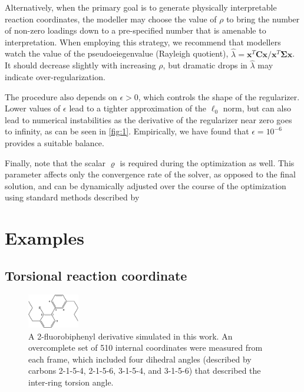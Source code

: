 \documentclass[aip, jcp, reprint, nolinenumbers, twocolumn, nobalancelastpage, nofootinbib]{revtex4-1}
\begin{document}
Alternatively, when the primary goal is to generate physically interpretable reaction coordinates, the modeller may choose the value of $\rho$ to bring the number of non-zero loadings down to a pre-specified number that is amenable to interpretation. When employing this strategy, we recommend that modellers watch the value of the pseudoeiegenvalue (Rayleigh quotient), $\hat{\lambda}=\mathbf{x}^T\mathbf{C}\mathbf{x} / \mathbf{x}^T \mathbf{\Sigma}\mathbf{x}$. It should decrease slightly with increasing $\rho$, but dramatic drops in $\hat{\lambda}$ may indicate over-regularization.

The procedure also depends on $\epsilon>0$, which controls the shape of the regularizer. Lower values of $\epsilon$ lead to a tighter approximation of the $\ell_0$ norm, but can also lead to numerical instabilities as the derivative of the regularizer near zero goes to infinity, as can be seen in \cref{fig:1}. Empirically, we have found that $\epsilon=10^{-6}$ provides a suitable balance.

Finally, note that the scalar $\varrho$ is required during the optimization as well. This parameter affects only the convergence rate of the solver, as opposed to the final solution, and can be dynamically adjusted over the course of the optimization using standard methods described by \citet{boyd2011distributed}



\section{Examples}
\subsection{Torsional reaction coordinate}

\begin{figure}
\centering
\includegraphics[width=0.2\textwidth]{bipehnyl-chemdraw-crop.pdf}
\caption{\label{fig:biphenyl} A 2-fluorobiphenyl derivative simulated in this work. An overcomplete set of 510 internal coordinates were measured from each frame, which included four dihedral angles (described by carbons 2-1-5-4, 2-1-5-6, 3-1-5-4, and 3-1-5-6) that described the inter-ring torsion angle.}
\end{figure}
\end{document}
